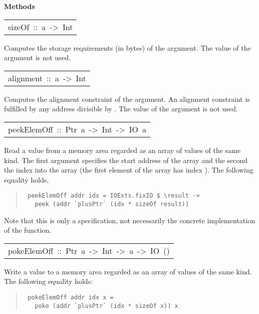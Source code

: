 \begin{haddockdesc}
\haddockpremethods{}\textbf{Methods}
\begin{haddockdesc}
\item[\begin{tabular}{@{}l}
sizeOf\ ::\ a\ ->\ Int
\end{tabular}]\haddockbegindoc
Computes the storage requirements (in bytes) of the argument.
 The value of the argument is not used.
\par

\end{haddockdesc}
\begin{haddockdesc}
\item[\begin{tabular}{@{}l}
alignment\ ::\ a\ ->\ Int
\end{tabular}]\haddockbegindoc
Computes the alignment constraint of the argument.  An
 alignment constraint  is fulfilled by any address divisible
 by .  The value of the argument is not used.
\par

\end{haddockdesc}
\begin{haddockdesc}
\item[\begin{tabular}{@{}l}
peekElemOff\ ::\ Ptr\ a\ ->\ Int\ ->\ IO\ a
\end{tabular}]\haddockbegindoc
Read a value from a memory area regarded as an array
         of values of the same kind.  The first argument specifies
         the start address of the array and the second the index into
         the array (the first element of the array has index
         ).  The following equality holds,
\par
\begin{quote}
{\haddockverb\begin{verbatim}
 peekElemOff addr idx = IOExts.fixIO $ \result ->
   peek (addr `plusPtr` (idx * sizeOf result))
\end{verbatim}}
\end{quote}
Note that this is only a specification, not
         necessarily the concrete implementation of the
         function.
\par

\end{haddockdesc}
\begin{haddockdesc}
\item[\begin{tabular}{@{}l}
pokeElemOff\ ::\ Ptr\ a\ ->\ Int\ ->\ a\ ->\ IO\ ()
\end{tabular}]\haddockbegindoc
Write a value to a memory area regarded as an array of
         values of the same kind.  The following equality holds:
\par
\begin{quote}
{\haddockverb\begin{verbatim}
 pokeElemOff addr idx x = 
   poke (addr `plusPtr` (idx * sizeOf x)) x
\end{verbatim}}
\end{quote}


\end{haddockdesc}
\end{haddockdesc}
